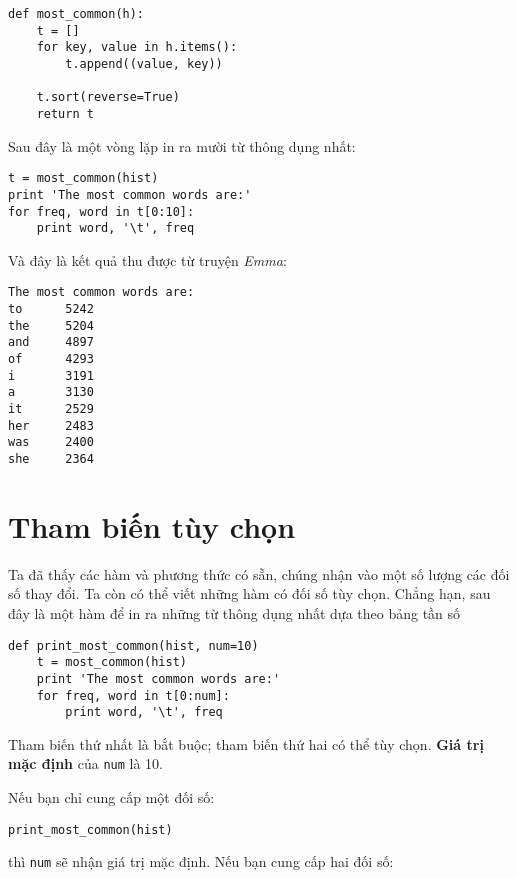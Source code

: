 \documentclass[11pt]{book}
\begin{document}
\beforeverb
\begin{verbatim}
def most_common(h):
    t = []
    for key, value in h.items():
        t.append((value, key))

    t.sort(reverse=True)
    return t
\end{verbatim}
\afterverb
%
Sau đây là một vòng lặp in ra mười từ thông dụng nhất:

\beforeverb
\begin{verbatim}
t = most_common(hist)
print 'The most common words are:'
for freq, word in t[0:10]:
    print word, '\t', freq
\end{verbatim}
\afterverb
%
Và đây là kết quả thu được từ truyện {\em Emma}:

\beforeverb
\begin{verbatim}
The most common words are:
to      5242
the     5204
and     4897
of      4293
i       3191
a       3130
it      2529
her     2483
was     2400
she     2364
\end{verbatim}
\afterverb
%

\section{Tham biến tùy chọn}


Ta đã thấy các hàm và phương thức có sẵn, chúng nhận vào một số lượng
các đối số thay đổi. Ta còn có thể viết những hàm có đối số tùy chọn.
Chẳng hạn, sau đây là một hàm để in ra những từ thông dụng nhất dựa theo
bảng tần số

\beforeverb
\begin{verbatim}
def print_most_common(hist, num=10)
    t = most_common(hist)
    print 'The most common words are:'
    for freq, word in t[0:num]:
        print word, '\t', freq
\end{verbatim}
\afterverb

Tham biến thứ nhất là bắt buộc; tham biến thứ hai có thể tùy chọn.
{\bf Giá trị mặc định} của {\tt num} là 10.


Nếu bạn chỉ cung cấp một đối số:

\beforeverb
\begin{verbatim}
print_most_common(hist)
\end{verbatim}
\afterverb

thì {\tt num} sẽ nhận giá trị mặc định. Nếu bạn cung cấp hai đối số:
\end{document}
